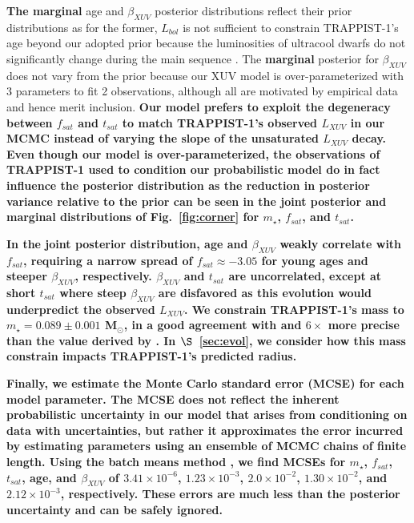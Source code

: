 \documentclass[twocolumn]{aastex62}
\newcommand{\xxx}[1]{{\textbf{#1}}}
\begin{document}
\xxx{The marginal} age and $\beta_{XUV}$ posterior distributions reflect their prior distributions as for the former, $L_{bol}$ is not sufficient to constrain TRAPPIST-1's age beyond our adopted prior because the luminosities of ultracool dwarfs do not significantly change during the main sequence \citep{Baraffe2015}. The \xxx{marginal} posterior for $\beta_{XUV}$ does not vary from the prior because our XUV model is over-parameterized with 3 parameters to fit 2 observations, although all are motivated by empirical data and hence merit inclusion. \xxx{Our model prefers to exploit the degeneracy between $f_{sat}$ and $t_{sat}$ to match TRAPPIST-1's observed $L_{XUV}$ in our MCMC instead of varying the slope of the unsaturated $L_{XUV}$ decay. Even though our model is over-parameterized, the observations of TRAPPIST-1 used to condition our probabilistic model do in fact influence the posterior distribution as the reduction in posterior variance relative to the prior can be seen in the joint posterior and marginal distributions of Fig.~\ref{fig:corner} for $m_{\star}$, $f_{sat}$, and $t_{sat}$.}

\xxx{In the joint posterior distribution, age and $\beta_{XUV}$ weakly correlate with $f_{sat}$, requiring a narrow spread of $f_{sat} \approx -3.05$ for young ages and steeper $\beta_{XUV}$, respectively. $\beta_{XUV}$ and $t_{sat}$ are uncorrelated, except at short $t_{sat}$ where steep $\beta_{XUV}$ are disfavored as this evolution would underpredict the observed $L_{XUV}$. We constrain TRAPPIST-1's mass to $m_{\star} = 0.089 \pm{0.001}$ M$_{\odot}$, in a good agreement with and $6\times$ more precise than the value derived by \citet{vanGrootel2018}. In $\S$~\ref{sec:evol}, we consider how this mass constrain impacts TRAPPIST-1's predicted radius.}

\xxx{Finally, we estimate the Monte Carlo standard error (MCSE) for each model parameter. The MCSE does not reflect the inherent probabilistic uncertainty in our model that arises from conditioning on data with uncertainties, but rather it approximates the error incurred by estimating parameters using an ensemble of MCMC chains of finite length. Using the batch means method \citep{Flegal2008,Flegal2010}, we find MCSEs for $m_{\star}$, $f_{sat}$, $t_{sat}$, age, and $\beta_{XUV}$ of $3.41 \times 10^{-6}$, $1.23 \times 10^{-3}$, $2.0 \times 10^{-2}$, $1.30 \times 10^{-2}$, and $2.12 \times 10^{-3}$, respectively. These errors are much less than the posterior uncertainty and can be safely ignored.}

\end{document}
